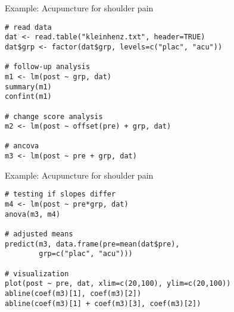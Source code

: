 \documentclass{beamer}
\begin{document}
{

\begin{frame}[fragile]{Example: Acupuncture for shoulder pain}
\begin{lstlisting}
# read data
dat <- read.table("kleinhenz.txt", header=TRUE)
dat$grp <- factor(dat$grp, levels=c("plac", "acu"))

# follow-up analysis
m1 <- lm(post ~ grp, dat)
summary(m1)
confint(m1)

# change score analysis
m2 <- lm(post ~ offset(pre) + grp, dat)

# ancova
m3 <- lm(post ~ pre + grp, dat)
\end{lstlisting}
\end{frame}

\begin{frame}[fragile]{Example: Acupuncture for shoulder pain}
\begin{lstlisting}
# testing if slopes differ
m4 <- lm(post ~ pre*grp, dat)
anova(m3, m4)

# adjusted means
predict(m3, data.frame(pre=mean(dat$pre),
        grp=c("plac", "acu")))

# visualization
plot(post ~ pre, dat, xlim=c(20,100), ylim=c(20,100))
abline(coef(m3)[1], coef(m3)[2])
abline(coef(m3)[1] + coef(m3)[3], coef(m3)[2])
\end{lstlisting}
\end{frame}


}
\end{document}
